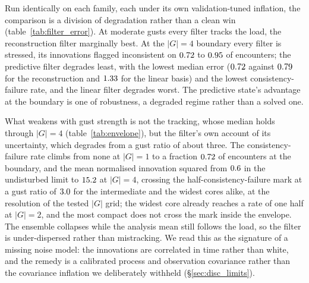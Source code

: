 Run identically on each family, each under its own validation-tuned inflation, the comparison is a division of degradation rather than a clean win (table~\ref{tab:filter_error}). At moderate gusts every filter tracks the load, the reconstruction filter marginally best. At the $|G| = 4$ boundary every filter is stressed, its innovations flagged inconsistent on $0.72$ to $0.95$ of encounters; the predictive filter degrades least, with the lowest median error ($0.72$ against $0.79$ for the reconstruction and $1.33$ for the linear basis) and the lowest consistency-failure rate, and the linear filter degrades worst. The predictive state's advantage at the boundary is one of robustness, a degraded regime rather than a solved one.\re



What weakens with gust strength is not the tracking, whose median holds through $|G| = 4$ (table~\ref{tab:envelope}), but the filter's own account of its uncertainty, which degrades from a gust ratio of about three. The consistency-failure rate climbs from none at $|G| = 1$ to a fraction $0.72$ of encounters at the boundary, and the mean normalised innovation squared from $0.6$ in the undisturbed limit to $15.2$ at $|G| = 4$, crossing
the half-consistency-failure mark at a gust ratio of $3.0$ for the intermediate and the widest cores alike, at the resolution of the tested $|G|$ grid; the widest core already reaches a rate of one half at $|G| = 2$, and the most compact does not cross the mark inside the envelope. The ensemble collapses while the analysis mean still follows the load, so the filter is under-dispersed rather than mistracking. We read this as the signature of a missing noise model: the innovations are correlated in time rather than white, and the remedy is a calibrated process and observation covariance rather than the covariance inflation we deliberately withheld (\S\ref{sec:disc_limits}).\re

